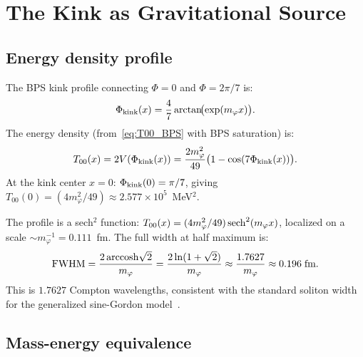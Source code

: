 \documentclass[11pt]{article}
\theoremstyle{remark}
\begin{document}
\section{The Kink as Gravitational Source}
\label{sec:kink_source}

\subsection{Energy density profile}

The BPS kink profile connecting $\Phi = 0$ and $\Phi = 2\pi/7$ is:
\begin{equation}
  \Phi_{\rm kink}(x) = \frac{4}{7}\arctan\!\bigl(\exp(m_\varphi x)\bigr).
\label{eq:kink_profile}
\end{equation}
The energy density (from~\eqref{eq:T00_BPS} with BPS saturation) is:
\begin{equation}
  T_{00}(x) = 2V(\Phi_{\rm kink}(x)) = \frac{2m_\varphi^2}{49}
  \bigl(1 - \cos(7\Phi_{\rm kink}(x))\bigr).
\label{eq:T00_profile}
\end{equation}
At the kink center $x=0$: $\Phi_{\rm kink}(0) = \pi/7$, giving
$T_{00}(0) = (4m_\varphi^2/49)\approx 2.577\times10^5$~MeV$^2$.

The profile is a sech$^2$ function: $T_{00}(x) = (4m_\varphi^2/49)\,{\rm sech}^2(m_\varphi x)$,
localized on a scale $\sim m_\varphi^{-1} = 0.111$~fm.
The full width at half maximum is:
\begin{equation}
  {\rm FWHM} = \frac{2\,{\rm arccosh}\sqrt{2}}{m_\varphi}
  = \frac{2\ln(1+\sqrt{2})}{m_\varphi}
  \approx \frac{1.7627}{m_\varphi} \approx 0.196\;\text{fm}.
\label{eq:fwhm}
\end{equation}
This is $1.7627$ Compton wavelengths, consistent with the standard soliton width
for the generalized sine-Gordon model~\cite{Rajaraman1982,DashenHasslacherNeveu1975}.

\subsection{Mass-energy equivalence}
\label{ssec:mass_energy}
\end{document}
